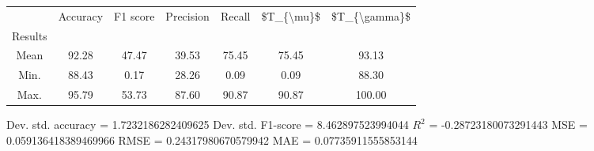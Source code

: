\begin{tabular}{|c|c|c|c|c|c|c|}
\toprule
{} &  Accuracy &  F1 score &  Precision &  Recall &  \$T\_\{\textbackslash mu\}\$ &  \$T\_\{\textbackslash gamma\}\$ \\
Results &           &           &            &         &            &               \\
\hline
Mean    &     92.28 &     47.47 &      39.53 &   75.45 &      75.45 &         93.13 \\
Min.    &     88.43 &      0.17 &      28.26 &    0.09 &       0.09 &         88.30 \\
Max.    &     95.79 &     53.73 &      87.60 &   90.87 &      90.87 &        100.00 \\
\bottomrule
\end{tabular}

 Dev. std. accuracy = 1.7232186282409625
 Dev. std. F1-score = 8.462897523994044
 $R^2$ = -0.28723180073291443
 MSE = 0.059136418389469966
 RMSE = 0.24317980670579942
 MAE = 0.07735911555853144